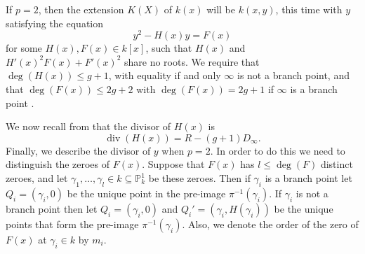 \documentclass[draft, 11pt]{article} %
\theoremstyle{plain}
\theoremstyle{remark}
\DeclareMathOperator{\di}{div}
\begin{document}
If $p=2$, then the extension $K(X)$ of $k(x)$ will be $k(x,y)$, this time with $y$ satisfying the equation
\begin{equation}\label{definep=2}
y^2 - H(x)y = F(x)
\end{equation}
for some $H(x),F(x) \in k[x]$, such that $H(x)$ and $H'(x)^2F(x) + F'(x)^2$ share no roots.
We require that $\deg(H(x)) \leq g+1$, with equality if and only $\infty$ is not a branch point, and that $\deg(F(x)) \leq 2g+2$ with $\deg(F(x)) = 2g+1$ if $\infty$ is a branch point  \cite[Prop 7.4.24]{liu}.


We now recall from \cite[\S 6]{faithfulaction} that the divisor of $H(x)$ is
\begin{equation}\label{divisorofH}
\di (H(x))  = R - (g+1)D_\infty. 
\end{equation}
Finally, we describe the divisor of $y$ when $p=2$.
In order to do this we need to distinguish the zeroes of $F(x)$.
Suppose that $F(x)$ has $l \leq \deg(F)$ distinct zeroes, and let $\gamma_1, \ldots, \gamma_l \in k \subseteq \mathbb P_k^1$ be these zeroes.
Then if $\gamma_i$ is a branch point let $Q_i = (\gamma_i, 0)$ be the unique point in the pre-image $\pi^{-1}(\gamma_i)$.
If $\gamma_i$ is not a branch point then let $Q_i = (\gamma_i, 0)$ and $Q_i' = (\gamma_i, H(\gamma_i))$ be the unique points that form the pre-image $\pi^{-1}(\gamma_i)$.
Also, we denote the order of the zero of $F(x)$ at $\gamma_i \in k$ by $m_i$.
\end{document}
